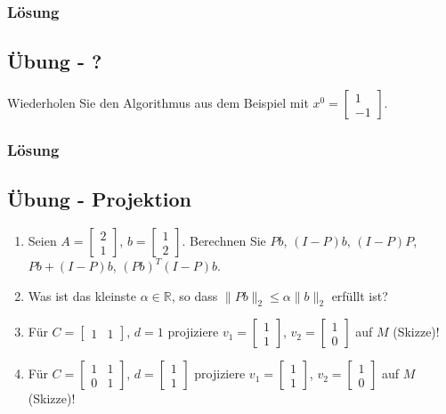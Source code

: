 \subsubsection{Lösung} 

\subsection*{Übung - ?}
\label{sec:uebung_kapitel_1_?} 
Wiederholen Sie den Algorithmus aus dem Beispiel mit $x^0=\begin{bmatrix}1\\ -1 \end{bmatrix}$. 

\subsubsection{Lösung} 

\subsection*{Übung - Projektion}
\label{sec:uebung_kapitel_1_projektion} 
\begin{enumerate}[label=\alph*)]
	\item Seien $A=\begin{bmatrix}
							2\\1
							\end{bmatrix}$, $b=\begin{bmatrix}
							1\\2
							\end{bmatrix}$. Berechnen Sie $Pb$, $(I-P)b$, $(I-P)P$, $Pb+(I-P)b$, $(Pb)^T(I-P)b$.
	\item Was ist das kleinste $\alpha\in\mathbb{R}$, so dass $\|Pb\|_2\le\alpha\|b\|_2$ erfüllt ist? 
  \item Für $C=\begin{bmatrix}1 & 1 \end{bmatrix}$, $d=1$ projiziere $v_1=\begin{bmatrix}1 \\ 1 \end{bmatrix}$, $v_2=\begin{bmatrix}1 \\ 0 \end{bmatrix}$ auf $M$ (Skizze)!
  \item Für $C=\begin{bmatrix}1 & 1\\ 0 & 1 \end{bmatrix}$, $d=\begin{bmatrix} 1\\1\end{bmatrix}$ projiziere $v_1=\begin{bmatrix}1 \\ 1 \end{bmatrix}$, $v_2=\begin{bmatrix}1 \\ 0
  \end{bmatrix}$ auf $M$ (Skizze)!
\end{enumerate}

